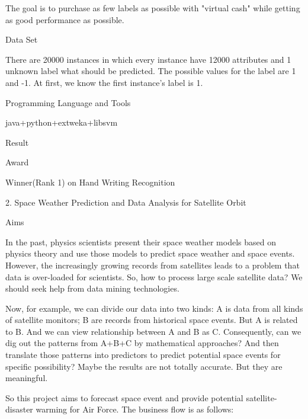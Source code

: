 \documentclass[10pt,letterpaper]{article}
\renewenvironment{itemize}{
  \begin{list}{}{
    \setlength{\leftmargin}{1.5em}
    \setlength{\itemsep}{0.25em}
    \setlength{\parskip}{0pt}
    \setlength{\parsep}{0.25em}
  }
}{
  \end{list}
}
\begin{document}
\begin{itemize}
\begin{itemize}
\begin{itemize}
\begin{itemize}
		\end{itemize}
		\item The goal is to purchase as few labels as possible with "virtual cash" while getting as good performance as possible.
		\end{itemize}
	\item Data Set
		\begin{itemize}
		\item There are 20000 instances in which every instance have 12000 attributes and 1 unknown label what should be predicted. The possible values for the label are 1 and -1. At first, we know the first instance's label is 1.
		\end{itemize}
	\item Programming Language and Tools
		\begin{itemize}
		\item java+python+extweka+libsvm
		\end{itemize}
	\item Result
	\item Award
		\begin{itemize}
		\item Winner(Rank 1) on Hand Writing Recognition
		\end{itemize}	
	\end{itemize}
\item 2. Space Weather Prediction and Data Analysis for Satellite Orbit
	\begin{itemize}
	\item Aims
	\begin{itemize}
	\item In the past, physics scientists present their space weather models based on physics theory and use those models to predict space weather and space events. However, the increasingly growing records from satellites leads to a problem that data is over-loaded for scientists. So, how to process large scale satellite data? We should seek help from data mining technologies.
	\item Now, for example, we can divide our data into two kinds: A is data from all kinds of satellite monitors; B are records from historical space events. But A is related to B. And we can view relationship between A and B as C. Consequently, can we dig out the patterns from A+B+C by mathematical approaches? And then translate those patterns into predictors to predict potential space events for specific possibility? Maybe the results are not totally accurate. But they are meaningful.
	\item So this project aims to forecast space event and provide potential satellite-disaster warming for Air Force. The business flow is as follows:

\end{itemize}
\end{itemize}
\end{itemize}
\end{document}
